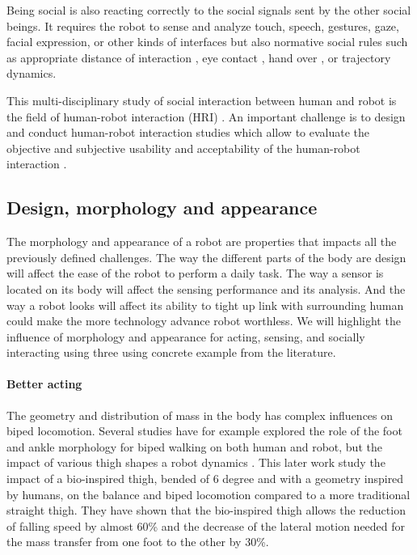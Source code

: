 Being social is also reacting correctly to the social signals sent by the other social beings. It requires the robot to sense and analyze touch, speech, gestures, gaze, facial expression, or other kinds of interfaces but also normative social rules such as appropriate distance of interaction \cite{strait2014let}, eye contact \cite{andrist2014conversational}, hand over \cite{moon2014meet}, or trajectory \cite{kruse2014evaluating} dynamics.

This multi-disciplinary study of social interaction between human and robot is the field of human-robot interaction (HRI) \cite{fong2003survey,dautenhahn2007socially,goodrich2007human}. An important challenge is to design and conduct human-robot interaction studies which allow to evaluate the objective and subjective usability and acceptability of the human-robot interaction \cite{scholtz2003theory,walters2005practical,young2011evaluating}.

\subsection{Design, morphology and appearance}


The morphology and appearance of a robot are properties that impacts all the previously defined challenges. The way the different parts of the body are design will affect the ease of the robot to perform a daily task. The way a sensor is located on its body will affect the sensing performance and its analysis. And the way a robot looks will affect its ability to tight up link with surrounding human could make the more technology advance robot worthless. We will highlight the influence of morphology and appearance for acting, sensing, and socially interacting using three using concrete example from the literature.

\paragraph{Better acting} The geometry and distribution of mass in the body has complex influences on biped locomotion. Several studies have for example explored the role of the foot and ankle morphology for biped walking on both human and robot, but the impact of various thigh shapes a robot dynamics \cite{lapeyre2013poppy}. This later work study the impact of a bio-inspired thigh, bended of 6 degree and with a geometry inspired by humans, on the balance and biped locomotion compared to a more traditional straight thigh. They have shown that the bio-inspired thigh allows the reduction of falling speed by almost 60\% and the decrease of the lateral motion needed for the mass transfer from one foot to the other by 30\%.

